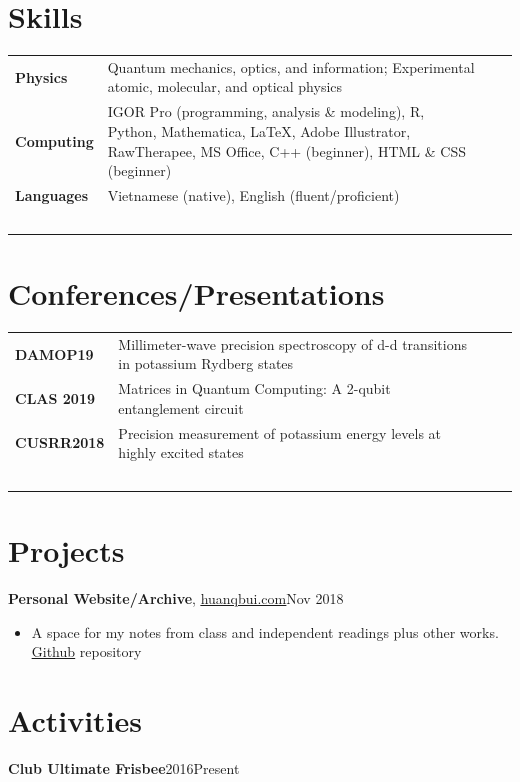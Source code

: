 \documentclass[a4paper, 9pt]{article}
\begin{document}
	\section*{\normalsize{{\color{colby}Skills}}}
		\begin{tabular}{lp{15.5cm}lp{9in}}
			
			\textbf{Physics} & Quantum mechanics, optics, and information; Experimental atomic, molecular, and optical physics\\
			
			\textbf{Computing} & IGOR Pro (programming, analysis \& modeling), R, Python, Mathematica, \LaTeX{}, Adobe Illustrator, RawTherapee, MS Office, C++ (beginner),  HTML \& CSS (beginner)\\
			
			
			\textbf{Languages} & Vietnamese ({native}), English ({fluent/proficient})\\
			$\,$
		\end{tabular}
	
	\section*{\normalsize{{\color{colby}Conferences/Presentations}}}
		\begin{tabular}{lp{13.5cm}lp{8in}}
			\textbf{DAMOP19} & Millimeter-wave precision spectroscopy of d-d transitions in potassium Rydberg states \\
			\textbf{CLAS 2019} & Matrices in Quantum Computing: A 2-qubit entanglement circuit\\
			\textbf{CUSRR2018} & Precision measurement of potassium energy levels at highly excited states\\
			$\,$
		\end{tabular}
	
	\section*{\normalsize{{\color{colby}\textbf{Projects}}}}
	\textbf{Personal Website/Archive}, \href{https://huanqbui.com}{\underline{huanqbui.com}}\hfill Nov 2018
	\begin{itemize}[noitemsep, nolistsep]
		\setlength{\itemindent}{0.2in}
		\item A space for my notes from class and independent readings plus other works. \href{https://github.com/huanium/huanium}{\underline{Github}} repository\\
	\end{itemize}
	
	\section*{\normalsize{{\color{colby}\textbf{Activities}}}}
	\textbf{Club Ultimate Frisbee}\hfill 2016\textemdash Present

	
\end{document}
